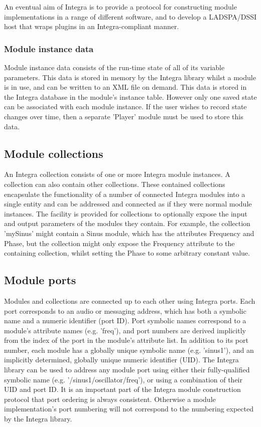 \documentclass{article}
\begin{document}
An eventual aim of Integra is to provide a protocol for constructing module implementations in a range of different software, and to develop a LADSPA/DSSI host that wraps plugins in an Integra-compliant manner.

\subsubsection{Module instance data}\label{subsubsec:module_instance_data}

Module instance data consists of the run-time state of all of its variable parameters. This data is stored in memory by the Integra library whilst a module is in use, and can be written to an XML file on demand. This data is stored in the Integra database in the module's instance table. However only one saved state can be associated with each module instance. If the user wishes to record state changes over time, then a separate 'Player' module must be used to store this data.

\subsection{Module collections}\label{subsec:module_collections}

An Integra collection consists of one or more Integra module instances. A collection can also contain other collections. These contained collections encapsulate the functionality of a number of connected Integra modules into a single entity and can be addressed and connected as if they were normal module instances. The facility is provided for collections to optionally expose the input and output parameters of the modules they contain. For example, the collection 'mySinus' might contain a Sinus module, which has the attributes Frequency and Phase, but the collection might only expose the Frequency attribute to the containing collection, whilst setting the Phase to some arbitrary constant value.

\subsection{Module ports}\label{subsec:module_ports}

Modules and collections are connected up to each other using Integra ports. Each port corresponds to an audio or messaging address, which has both a symbolic name and a numeric identifier (port ID). Port symbolic names correspond to a module's attribute names (e.g. 'freq'), and port numbers are derived implicitly from the index of the port in the module's attribute list. In addition to its port number, each module has a globally unique symbolic name (e.g. 'sinus1'), and an implicitly determined, globally unique numeric identifier (UID). The Integra library can be used to address any module port using either their fully-qualified symbolic name (e.g. '/sinus1/oscillator/freq'), or using a combination of their UID and port ID. It is an important part of the Integra module construction protocol that port ordering is always consistent. Otherwise a module implementation's port numbering will not correspond to the numbering expected by the Integra library.
\end{document}
